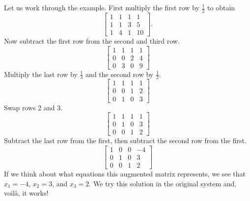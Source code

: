 \documentclass{ximera}
\begin{document}
Let us work through the example.  First multiply the first row by $\frac{1}{2}$ to obtain
\begin{equation*}
    \left[
        \begin{array}{ccc|c}
            1 & 1 & 1 & 1 \\
            1 & 1 & 3 & 5 \\
            1 & 4 & 1 & 10
        \end{array}
    \right] .
\end{equation*}
Now subtract the first row from the second and third row.
\begin{equation*}
    \left[
        \begin{array}{ccc|c}
            1 & 1 & 1 & 1 \\
            0 & 0 & 2 & 4 \\
            0 & 3 & 0 & 9
        \end{array}
    \right]
\end{equation*}
Multiply the last row by $\frac{1}{3}$ and the second row by $\frac{1}{2}$.
\begin{equation*}
    \left[
        \begin{array}{ccc|c}
            1 & 1 & 1 & 1 \\
            0 & 0 & 1 & 2 \\
            0 & 1 & 0 & 3
        \end{array}
    \right]
\end{equation*}
Swap rows 2 and 3.
\begin{equation*}
    \left[
        \begin{array}{ccc|c}
            1 & 1 & 1 & 1 \\
            0 & 1 & 0 & 3 \\
            0 & 0 & 1 & 2
        \end{array}
    \right]
\end{equation*}
Subtract the last row from the first, then subtract the second row from the first.
\begin{equation*}
    \left[
        \begin{array}{ccc|c}
            1 & 0 & 0 & -4 \\
            0 & 1 & 0 & 3 \\
            0 & 0 & 1 & 2
        \end{array}
    \right]
\end{equation*}
If we think about what equations this augmented matrix represents, we see that $x_1 = -4$, $x_2 = 3$, and $x_3 = 2$.  We try this solution in the original system and, voil\`a, it works!
\end{document}
